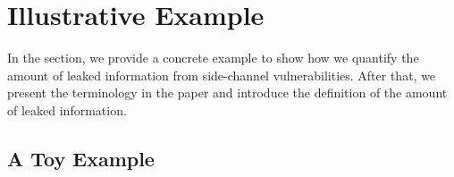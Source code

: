 \section{Illustrative Example}
In the section, we provide a concrete example to show how we 
quantify the amount of leaked information from side-channel
vulnerabilities. After that, we present the terminology in the
paper and introduce the definition of the amount of 
leaked information.
\subsection{A Toy Example}
